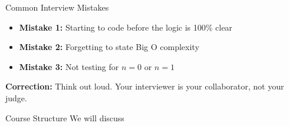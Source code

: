 \begin{frame}{Common Interview Mistakes}
  \begin{itemize}
    \item \textbf{Mistake 1:} Starting to code before the logic is 100\% clear 
    \item \textbf{Mistake 2:} Forgetting to state Big O complexity 
    \item \textbf{Mistake 3:} Not testing for $n=0$ or $n=1$ 
  \end{itemize}
  \vspace{0.5cm}
  \textbf{Correction:} Think out loud. Your interviewer is your collaborator, not your judge.
\end{frame}

\begin{frame}{Course Structure}
  \centering
  We will discuss 
\end{frame}